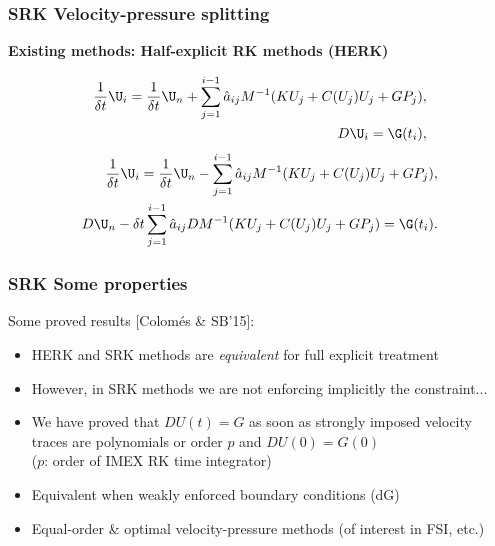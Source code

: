 \begin{frame}
\frametitle{SRK Velocity-pressure splitting}
\textbf{Existing methods: Half-explicit RK methods (HERK)}
\vspace{-0.5cm}
\begin{overprint}
\begin{align*}
\frac{1}{\delta t}\U_i=\frac{1}{\delta t}\U_n + \sum_{j=1}^{i-1}\hat{a}_{ij} M^{-1} (K U_j + C(U_j) U_j + G P_j), \\
 D \U_i = \G(t_i),
\end{align*}
\begin{align*}
\frac{1}{\delta t}\U_i=\frac{1}{\delta t}\U_n - \sum_{j=1}^{i-1}\hat{a}_{ij} M^{-1} (K U_j + C(U_j) U_j + G P_j), \\
D \U_n - \delta t \sum_{j=1}^{i-1}\hat{a}_{ij} DM^{-1}(K U_j + C(U_j) U_j + G P_j) = \G(t_i).
\end{align*}
\end{overprint}
\vspace{0.3cm}
\end{frame}
\begin{frame}
\frametitle{SRK Some properties}
\vfill
Some proved results [Colom\'es \& SB'15]:
\begin{itemize}
\item HERK and SRK methods are \emph{equivalent} for full explicit treatment
\item However, in SRK methods we are not enforcing implicitly the constraint...
\item We have proved that $D U(t) = G$ as soon as strongly imposed velocity traces are polynomials or order $p$ and $D U(0) = G(0)$
\\ {\small ($p$: order of IMEX RK time integrator) }
\item Equivalent when weakly enforced boundary conditions (dG)
\item Equal-order \& optimal velocity-pressure methods (of interest in FSI, etc.)
\end{itemize}
\vfill
\end{frame}
